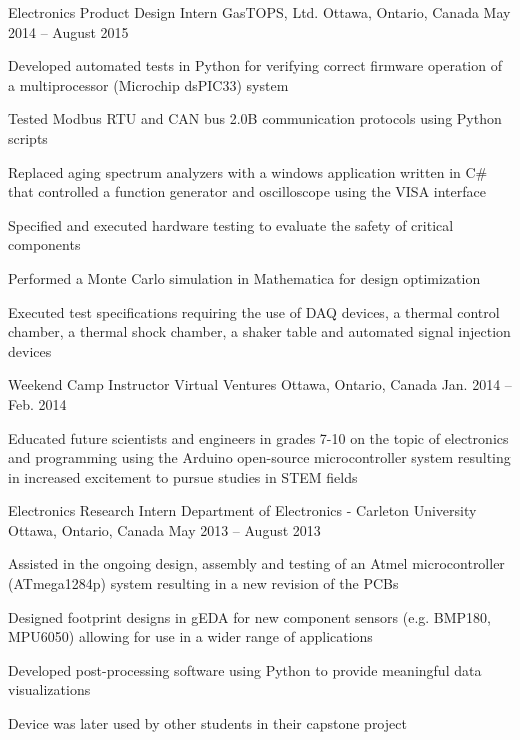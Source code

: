\begin{cventries}
  \cventry
    {Electronics Product Design Intern} %
    {GasTOPS, Ltd.} %
    {Ottawa, Ontario, Canada} %
    {May 2014 – August 2015} %
    {
      \begin{cvitems} %
        \item {Developed automated tests in Python for verifying correct firmware operation of a multiprocessor (Microchip dsPIC33) system}
        \item {Tested Modbus RTU and CAN bus 2.0B communication protocols using Python scripts}
        \item {Replaced aging spectrum analyzers with a windows application written in C\# that controlled a function generator and oscilloscope using the VISA interface}
        \item {Specified and executed hardware testing to evaluate the safety of critical components}
        \item {Performed a Monte Carlo simulation in Mathematica for design optimization}
        \item {Executed test specifications requiring the use of DAQ devices, a thermal control chamber, a thermal shock chamber, a shaker table and automated signal injection devices}
      \end{cvitems}
    }

  \cventry
    {Weekend Camp Instructor} %
    {Virtual Ventures} %
    {Ottawa, Ontario, Canada} %
    {Jan. 2014 – Feb. 2014} %
    {
      \begin{cvitems} %
        \item {Educated future scientists and engineers in grades 7-10 on the topic of electronics and programming using the Arduino open-source microcontroller system resulting in increased excitement to pursue studies in STEM fields}
      \end{cvitems}
    }

  \cventry
    {Electronics Research Intern} %
    {Department of Electronics - Carleton University} %
    {Ottawa, Ontario, Canada} %
    {May 2013 – August 2013} %
    {
      \begin{cvitems} %
        \item {Assisted in the ongoing design, assembly and testing of an Atmel microcontroller (ATmega1284p) system resulting in a new revision of the PCBs}
        \item {Designed footprint designs in gEDA for new component sensors (e.g. BMP180, MPU6050) allowing for use in a wider range of applications}
        \item {Developed post-processing software using Python to provide meaningful data visualizations}
        \item {Device was later used by other students in their capstone project}
      \end{cvitems}
    }

\end{cventries}
